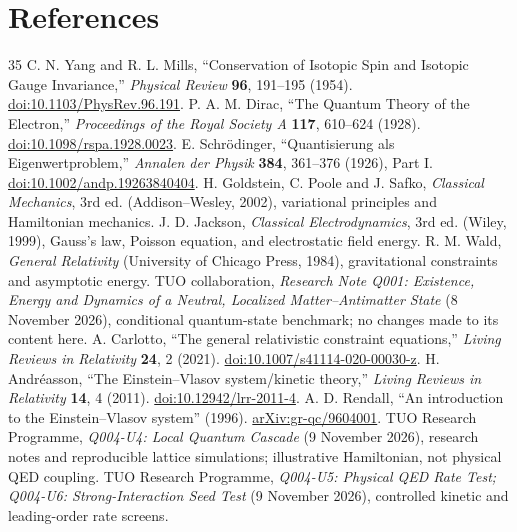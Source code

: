 \documentclass[11pt,a4paper]{article}
\theoremstyle{tmon}
\theoremstyle{definition}
\begin{document}
\section*{References}
\begin{thebibliography}{35}
C. N. Yang and R. L. Mills, ``Conservation of Isotopic Spin and Isotopic Gauge Invariance,'' \emph{Physical Review} \textbf{96}, 191--195 (1954). \href{https://doi.org/10.1103/PhysRev.96.191}{doi:10.1103/PhysRev.96.191}.
P. A. M. Dirac, ``The Quantum Theory of the Electron,'' \emph{Proceedings of the Royal Society A} \textbf{117}, 610--624 (1928). \href{https://doi.org/10.1098/rspa.1928.0023}{doi:10.1098/rspa.1928.0023}.
E. Schr\"odinger, ``Quantisierung als Eigenwertproblem,'' \emph{Annalen der Physik} \textbf{384}, 361--376 (1926), Part I. \href{https://doi.org/10.1002/andp.19263840404}{doi:10.1002/andp.19263840404}.
H. Goldstein, C. Poole and J. Safko, \emph{Classical Mechanics}, 3rd ed. (Addison--Wesley, 2002), variational principles and Hamiltonian mechanics.
J. D. Jackson, \emph{Classical Electrodynamics}, 3rd ed. (Wiley, 1999), Gauss's law, Poisson equation, and electrostatic field energy.
R. M. Wald, \emph{General Relativity} (University of Chicago Press, 1984), gravitational constraints and asymptotic energy.
TUO collaboration, \emph{Research Note Q001: Existence, Energy and Dynamics of a Neutral, Localized Matter--Antimatter State} (8 November 2026), conditional quantum-state benchmark; no changes made to its content here.
A. Carlotto, ``The general relativistic constraint equations,'' \emph{Living Reviews in Relativity} \textbf{24}, 2 (2021). \href{https://doi.org/10.1007/s41114-020-00030-z}{doi:10.1007/s41114-020-00030-z}.
H. Andr\'easson, ``The Einstein--Vlasov system/kinetic theory,'' \emph{Living Reviews in Relativity} \textbf{14}, 4 (2011). \href{https://doi.org/10.12942/lrr-2011-4}{doi:10.12942/lrr-2011-4}.
A. D. Rendall, ``An introduction to the Einstein--Vlasov system'' (1996). \href{https://arxiv.org/abs/gr-qc/9604001}{arXiv:gr-qc/9604001}.
TUO Research Programme, \emph{Q004-U4: Local Quantum Cascade} (9 November 2026), research notes and reproducible lattice simulations; illustrative Hamiltonian, not physical QED coupling.
TUO Research Programme, \emph{Q004-U5: Physical QED Rate Test; Q004-U6: Strong-Interaction Seed Test} (9 November 2026), controlled kinetic and leading-order rate screens.

\end{thebibliography}
\end{document}
